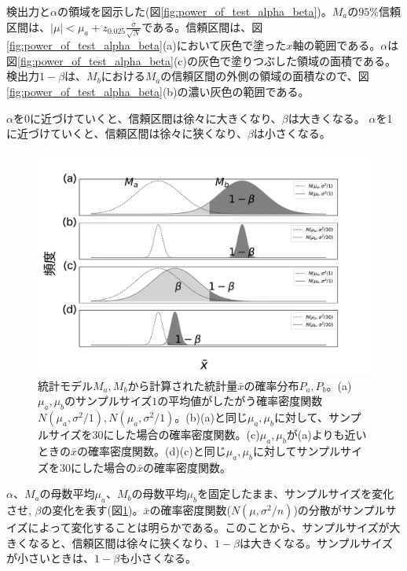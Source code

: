 検出力と$\alpha$の領域を図示した(図\ref{fig:power_of_test_alpha_beta})。$M_a$の$95\%$信頼区間は、$|\mu|<\mu_a+z_{0.025}\frac{\sigma}{\sqrt{N}}$である。信頼区間は、図\ref{fig:power_of_test_alpha_beta}(a)において灰色で塗った$x$軸の範囲である。$\alpha$は図\ref{fig:power_of_test_alpha_beta}(c)の灰色で塗りつぶした領域の面積である。
検出力$1-\beta$は、$M_b$における$M_a$の信頼区間の外側の領域の面積なので、図\ref{fig:power_of_test_alpha_beta}(b)の濃い灰色の範囲である。

$\alpha$を0に近づけていくと、信頼区間は徐々に大きくなり、$\beta$は大きくなる。
$\alpha$を1に近づけていくと、信頼区間は徐々に狭くなり、$\beta$は小さくなる。



\begin{figure}
    \begin{center}
        \includegraphics[width=15cm]{./image/04_/power_of_a_test_3.pdf}
        \caption{統計モデル$M_a,M_b$から計算された統計量$\bar{x}$の確率分布$P_a,P_b$。(a)$\mu_a,\mu_b$のサンプルサイズ$1$の平均値がしたがう確率密度関数$N(\mu_a,\sigma^2/1),N(\mu_a,\sigma^2/1)$。(b)(a)と同じ$\mu_a,\mu_b$に対して、サンプルサイズを$30$にした場合の確率密度関数。(c)$\mu_a,\mu_b$が(a)よりも近いときの$\bar{x}$の確率密度関数。(d)(c)と同じ$\mu_a,\mu_b$に対してサンプルサイズを$30$にした場合の$\bar{x}$の確率密度関数。}
        \label{fig:power_of_test_alpha_beta_sample_size}
    \end{center}
    \end{figure}

    

$\alpha$、$M_a$の母数平均$\mu_a$、$M_b$の母数平均$\mu_b$を固定したまま、サンプルサイズを変化させ,
$\beta$の変化を表す(図\ref{fig:power_of_test_alpha_beta_sample_size})。$\bar{x}$の確率密度関数($N(\mu,\sigma^2/n)$)の分散がサンプルサイズによって変化することは明らかである。このことから、サンプルサイズが大きくなると、信頼区間は徐々に狭くなり、$1-\beta$は大きくなる。サンプルサイズが小さいときは、$1-\beta$も小さくなる。

